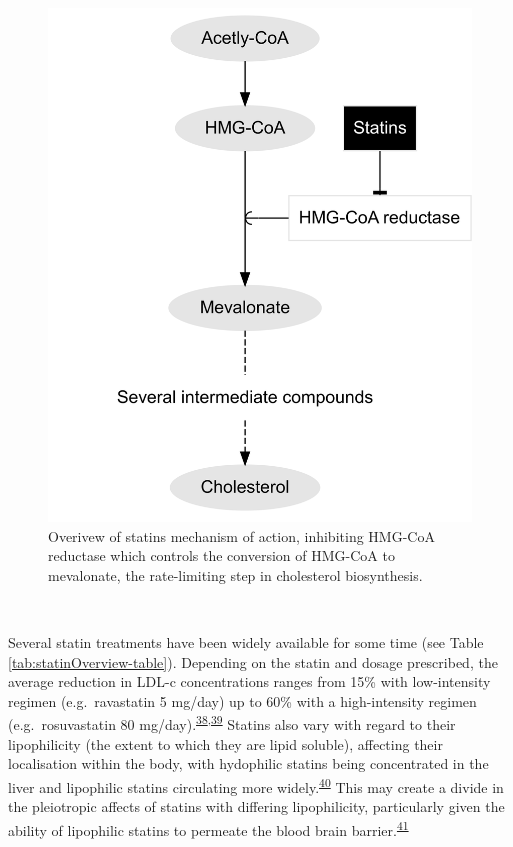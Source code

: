 \documentclass[a4paper, twoside]{templates/ociamthesis}
\begin{document}
~





\begin{figure}[H]

{\centering \includegraphics[width=0.5\linewidth]{figures/background/statinPath} 

}

\caption[Statin mechanism of action]{Overivew of statins mechanism of action, inhibiting HMG-CoA reductase which controls the conversion of HMG-CoA to mevalonate, the rate-limiting step in cholesterol biosynthesis.}\label{fig:statin-mechanisam}
\end{figure}

~

Several statin treatments have been widely available for some time (see Table \ref{tab:statinOverview-table}). Depending on the statin and dosage prescribed, the average reduction in LDL-c concentrations ranges from 15\% with low-intensity regimen (e.g.~ravastatin 5 mg/day) up to 60\% with a high-intensity regimen (e.g.~rosuvastatin 80 mg/day).\textsuperscript{\protect\hyperlink{ref-collins2016}{38},\protect\hyperlink{ref-law2003}{39}} Statins also vary with regard to their lipophilicity (the extent to which they are lipid soluble), affecting their localisation within the body, with hydophilic statins being concentrated in the liver and lipophilic statins circulating more widely.\textsuperscript{\protect\hyperlink{ref-schachter2005}{40}} This may create a divide in the pleiotropic affects of statins with differing lipophilicity, particularly given the ability of lipophilic statins to permeate the blood brain barrier.\textsuperscript{\protect\hyperlink{ref-sierra2011}{41}}

~
\end{document}
